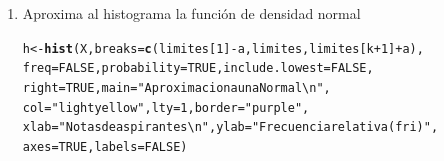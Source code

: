 \documentclass[12pt,letterpaper]{article}\usepackage[]{graphicx}\usepackage[]{color}
\makeatletter
\newcommand{\hlnum}[1]{\textcolor[rgb]{0.686,0.059,0.569}{#1}}%
\newcommand{\hlstr}[1]{\textcolor[rgb]{0.192,0.494,0.8}{#1}}%
\newcommand{\hlopt}[1]{\textcolor[rgb]{0,0,0}{#1}}%
\newcommand{\hlstd}[1]{\textcolor[rgb]{0.345,0.345,0.345}{#1}}%
\newcommand{\hlkwb}[1]{\textcolor[rgb]{0.69,0.353,0.396}{#1}}%
\newcommand{\hlkwc}[1]{\textcolor[rgb]{0.333,0.667,0.333}{#1}}%
\newcommand{\hlkwd}[1]{\textcolor[rgb]{0.737,0.353,0.396}{\textbf{#1}}}%
\newenvironment{kframe}{%
 \def\at@end@of@kframe{}%
 \ifinner\ifhmode%
  \def\at@end@of@kframe{\end{minipage}}%
  \begin{minipage}{\columnwidth}%
 \fi\fi%
 \def\FrameCommand##1{\hskip\@totalleftmargin \hskip-\fboxsep
 \colorbox{shadecolor}{##1}\hskip-\fboxsep
     \hskip-\linewidth \hskip-\@totalleftmargin \hskip\columnwidth}%
 \MakeFramed {\advance\hsize-\width
   \@totalleftmargin\z@ \linewidth\hsize
   \@setminipage}}%
 {\par\unskip\endMakeFramed%
 \at@end@of@kframe}
\newenvironment{knitrout}{}{} %
\makeatother
\begin{document}
\begin{enumerate}
\item Aproxima al histograma la funci\'on de densidad normal

\begin{knitrout}
\color{fgcolor}\begin{kframe}
\begin{alltt}
\hlstd{h} \hlkwb{<-} \hlkwd{hist}\hlstd{(X,} \hlkwc{breaks}\hlstd{=}\hlkwd{c}\hlstd{(limites[}\hlnum{1}\hlstd{]}\hlopt{-}\hlstd{a, limites, limites[k}\hlopt{+}\hlnum{1}\hlstd{]}\hlopt{+}\hlstd{a),}
          \hlkwc{freq} \hlstd{=} \hlnum{FALSE}\hlstd{,} \hlkwc{probability} \hlstd{=} \hlnum{TRUE}\hlstd{,} \hlkwc{include.lowest} \hlstd{=} \hlnum{FALSE}\hlstd{,}
          \hlkwc{right} \hlstd{=} \hlnum{TRUE}\hlstd{,} \hlkwc{main}\hlstd{=}\hlstr{"Aproximacion a una Normal\textbackslash{}n"}\hlstd{,}
          \hlkwc{col}\hlstd{=}\hlstr{"lightyellow"}\hlstd{,}\hlkwc{lty}\hlstd{=}\hlnum{1}\hlstd{,}\hlkwc{border}\hlstd{=}\hlstr{"purple"}\hlstd{,}
          \hlkwc{xlab}\hlstd{=}\hlstr{"Notas de aspirantes\textbackslash{}n"}\hlstd{,} \hlkwc{ylab}\hlstd{=}\hlstr{"Frecuencia relativa (fri)"}\hlstd{,}
          \hlkwc{axes}\hlstd{=}\hlnum{TRUE}\hlstd{,} \hlkwc{labels}\hlstd{=}\hlnum{FALSE}\hlstd{)}
\end{alltt}



\end{kframe}
\end{knitrout}
\end{enumerate}
\end{document}
